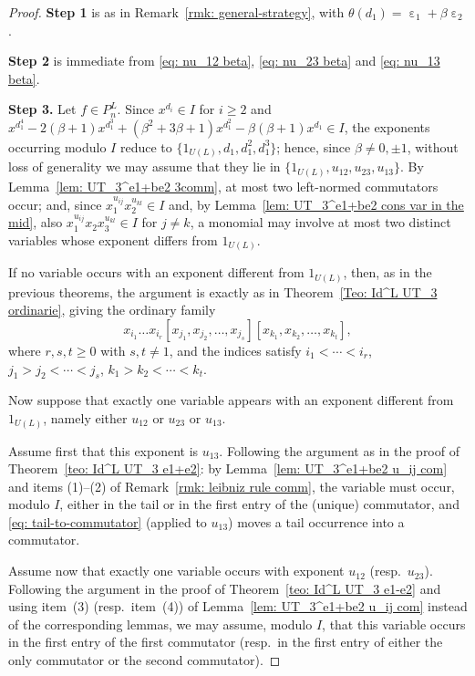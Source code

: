 \documentclass[a4paper,reqno]{amsart}
\theoremstyle{definition}
\numberwithin{equation}{section}
\numberwithin{theorem}{section}
\DeclareMathOperator{\e}{\varepsilon}
\begin{document}
\begin{proof}
\textbf{Step 1} is as in Remark~\ref{rmk: general-strategy}, with $\theta(d_1)=\e_1+\beta\e_2$.

\textbf{Step 2} is immediate from \eqref{eq: nu_12 beta}, \eqref{eq: nu_23 beta} and \eqref{eq: nu_13 beta}.

\textbf{Step 3.} Let $f\in P_n^L$. Since $x^{d_i}\in I$ for $i\geq 2$ and
$x^{d_1^4}- 2(\beta+1)x^{d_1^3}+(\beta^2 + 3 \beta +1) x^{d_1^2}- \beta(\beta+1) x^{d_1}\in I$, the
exponents occurring modulo $I$ reduce to $\{1_{U(L)}, d_1, d_1^2, d_1^3\}$; hence, since
$\beta \neq 0, \pm 1$, without loss of generality we may assume that they lie in
$\{1_{U(L)}, u_{12},u_{23}, u_{13}\}.$
By Lemma~\ref{lem: UT_3^e1+be2 3comm}, at most two left-normed commutators occur; and, since
$x_1^{u_{ij}}x_2^{u_{kl}}\in I$ and, by Lemma~\ref{lem: UT_3^e1+be2 cons var in the mid}, also
$x_1^{u_{ij}}x_2 x_3^{u_{kl}} \in I$ for $j\neq k$, a monomial may involve at most two distinct
variables whose exponent differs from $1_{U(L)}$.




If no variable occurs with an exponent different from $1_{U(L)}$, then, as in the previous theorems, the argument is exactly as in Theorem~\ref{Teo: Id^L UT_3 ordinarie}, giving the ordinary family
\begin{equation*}\label{eq: no id ord e1+be2}
    x_{i_{1}}\dots x_{i_{r}}[x_{j_1},x_{j_2},\dots,x_{j_s}][x_{k_1},x_{k_2},\dots,x_{k_t}],
\end{equation*}
where $ r, s, t\geq 0$ with $s,t\neq 1$, and the indices satisfy  $i_1< \cdots < i_r$, $j_1>j_2<  \cdots < j_s$,  $k_1>k_2<  \cdots < k_t$.

Now suppose that exactly  one variable appears with an exponent different from $1_{U(L)}$, namely either $u_{12}$ or $u_{23}$ or $u_{13}$.

Assume first that this exponent is $u_{13}$. 
Following the argument as in the proof of Theorem~\ref{teo: Id^L UT_3 e1+e2}: by Lemma~\ref{lem: UT_3^e1+be2 u_ij com} and items (1)--(2) of Remark~\ref{rmk: leibniz rule comm}, the variable must occur, modulo $I$, either in the tail or in the first entry of the (unique) commutator, and \eqref{eq: tail-to-commutator} (applied to $u_{13}$) moves a tail occurrence into a commutator.


 Assume now that exactly one variable occurs with exponent $u_{12}$ (resp.\ $u_{23}$). Following the argument in the proof of Theorem~\ref{teo: Id^L UT_3 e1-e2} and using item~(3) (resp.\ item~(4)) of Lemma~\ref{lem: UT_3^e1+be2 u_ij com} instead of the corresponding lemmas, we may assume, modulo $I$, that this variable occurs in the first entry of the first commutator (resp.\ in the first entry of either the only commutator or the second commutator).





\end{proof}
\end{document}
